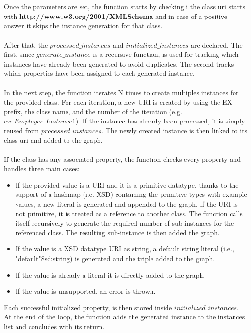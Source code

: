 \\
\\
Once the parameters are set, the function starts by checking i the class uri starts with \textbf{http://www.w3.org/2001/XMLSchema} and in case of a positive answer it skips the instance generation for that class.
\\
\\
After that, the $processed\_instances$ and $initialized\_instances$ are declared. The first, since $generate\_instance$ is a recursive function, is used for tracking which instances have already been generated to avoid duplicates. 
The second tracks which properties have been assigned to each generated instance.
\\
\\
In the next step, the function iterates N times to create multiples instances for the provided class. For each iteration, a new URI is created by using the EX prefix, the class name, and the number of the iteration (e.g. $ex:Employee\_Instance1$). If the instance has already been processed, it is simply reused from $processed\_instances$. The newly created instance is then linked to its class uri and added to the graph. 
\\
\\
If the class has any associated property, the function checks every property and handles three main cases: 
\begin{itemize}
	\item If the provided value is a URI and it is a primitive datatype, thanks to the support of a hashmap (i.e. XSD) containing the primitive types with example values, a new literal is generated and appended to the graph. If the URI is not primitive, it is treated as a reference to another class. The function calls itself recursively to generate the required number of sub-instances for the referenced class. The resulting sub-instance is then added the graph. 
	\item If the value is a XSD datatype URI as string, a default string literal (i.e., "default"^^xsd:string) is generated and the triple added to the graph.
	\item If the value is already a literal it is directly added to the graph.
	\item If the value is unsupported, an error is thrown.
\end{itemize}
Each successful initialized property, is then stored inside $initialized\_instances$.
At the end of the loop, the function adds the generated instance to the instances list and concludes with its return.
